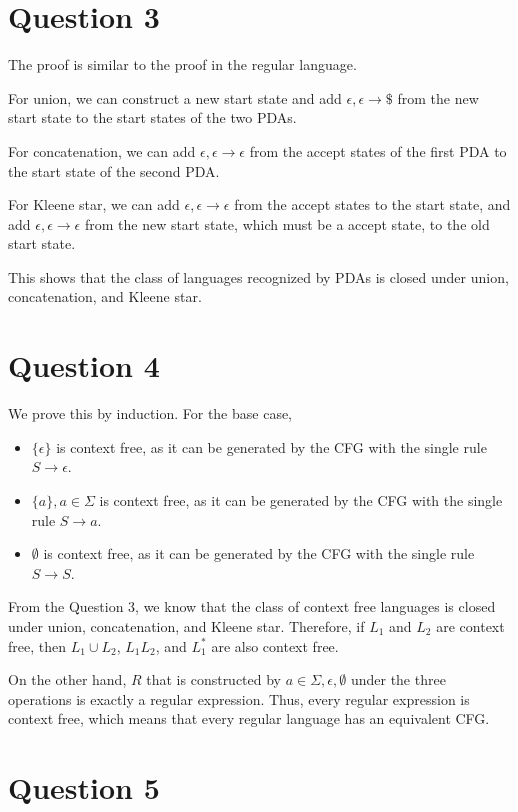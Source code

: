 \documentclass[a4paper, UTF-8]{article}
\theoremstyle{plain}
\begin{document}
\section{Question 3} 

The proof is similar to the proof in the regular language. 

For union, we can construct a new start state and add $\epsilon, \epsilon \to \mathdollar$ from the new start state to the start states of the two PDAs.

For concatenation, we can add $\epsilon, \epsilon \to \epsilon$ from the accept states of the first PDA to the start state of the second PDA.

For Kleene star, we can add $\epsilon, \epsilon \to \epsilon$ from the accept states to the start state, and add $\epsilon, \epsilon \to \epsilon$ from the new start state, which must be a accept state, to the old start state.

This shows that the class of languages recognized by PDAs is closed under union, concatenation, and Kleene star.

\section{Question 4} 

We prove this by induction. For the base case,
\begin{itemize}
    \item $\{\epsilon\}$ is context free, as it can be generated by the CFG with the single rule $S \to \epsilon$.
    \item $\{a\}, a\in \Sigma$ is context free, as it can be generated by the CFG with the single rule $S \to a$.
    \item $\emptyset$ is context free, as it can be generated by the CFG with the single rule $S \to S$.
\end{itemize}

From the Question 3, we know that the class of context free languages is closed under union, concatenation, and Kleene star. Therefore, if $L_1$ and $L_2$ are context free, then $L_1 \cup L_2$, $L_1 L_2$, and $L_1^*$ are also context free.

On the other hand, $R$ that is constructed by $a\in \Sigma, \epsilon, \emptyset$ under the three operations is exactly a regular expression. Thus, every regular expression is context free, which means that every regular language has an equivalent CFG.

\section{Question 5} 
\end{document}
